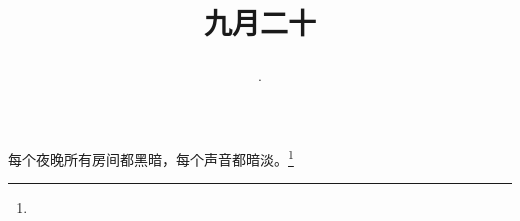 \title{\date[d=22,m=10,y=2024][year:cn-y,年,month:cn,day:cn,日,·,weekday]·九月二十 }
每个夜晚所有房间都黑暗，每个声音都暗淡。\footnote{ }

